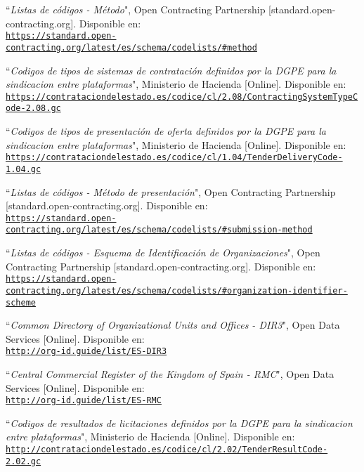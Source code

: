 \begin{thebibliography}{X}
            ``\textit{Listas de códigos - Método}", Open Contracting Partnership [standard.open-contracting.org]. Disponible en:
            \\ \texttt{\url{https://standard.open-contracting.org/latest/es/schema/codelists/\#method}}
            
            ``\textit{Codigos de tipos de sistemas de contratación definidos por la DGPE para la sindicacion entre plataformas}", Ministerio de Hacienda [Online]. Disponible en:
            \\ \texttt{\url{https://contrataciondelestado.es/codice/cl/2.08/ContractingSystemTypeCode-2.08.gc}}
            
            ``\textit{Codigos de tipos de presentación de oferta definidos por la DGPE para la sindicacion entre plataformas}", Ministerio de Hacienda [Online]. Disponible en:
            \\ \texttt{\url{https://contrataciondelestado.es/codice/cl/1.04/TenderDeliveryCode-1.04.gc}}
            
             ``\textit{Listas de códigos - Método de presentación}", Open Contracting Partnership [standard.open-contracting.org]. Disponible en:
            \\ \texttt{\url{https://standard.open-contracting.org/latest/es/schema/codelists/\#submission-method}}
            
            ``\textit{Listas de códigos - Esquema de Identificación de Organizaciones}", Open Contracting Partnership [standard.open-contracting.org]. Disponible en:
            \\ \texttt{\url{https://standard.open-contracting.org/latest/es/schema/codelists/\#organization-identifier-scheme}}
            
            ``\textit{Common Directory of Organizational Units and Offices - DIR3}", Open Data Services [Online]. Disponible en:
            \\ \texttt{\url{http://org-id.guide/list/ES-DIR3}}
            
            ``\textit{Central Commercial Register of the Kingdom of Spain - RMC}", Open Data Services [Online]. Disponible en:
            \\ \texttt{\url{http://org-id.guide/list/ES-RMC}}
        
            ``\textit{Codigos de resultados de licitaciones definidos por la DGPE para la sindicacion entre plataformas}", Ministerio de Hacienda [Online]. Disponible en:
            \\ \texttt{\url{http://contrataciondelestado.es/codice/cl/2.02/TenderResultCode-2.02.gc}}
            

\end{thebibliography}
